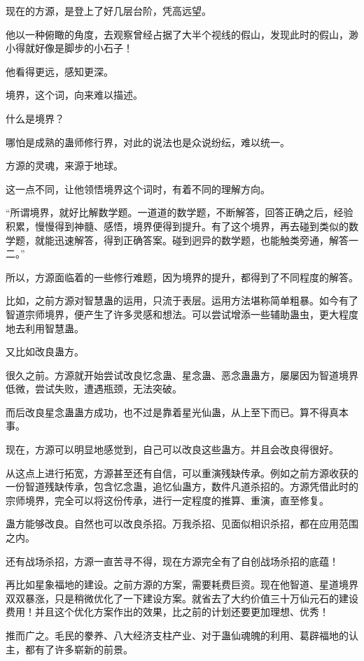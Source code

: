 \begin{this_body}
现在的方源，是登上了好几层台阶，凭高远望。

他以一种俯瞰的角度，去观察曾经占据了大半个视线的假山，发现此时的假山，渺小得就好像是脚步的小石子！

他看得更远，感知更深。

境界，这个词，向来难以描述。

什么是境界？

哪怕是成熟的蛊师修行界，对此的说法也是众说纷纭，难以统一。

方源的灵魂，来源于地球。

这一点不同，让他领悟境界这个词时，有着不同的理解方向。

“所谓境界，就好比解数学题。一道道的数学题，不断解答，回答正确之后，经验积累，慢慢得到神髓、感悟，境界便得到提升。有了这个境界，再去碰到类似的数学题，就能迅速解答，得到正确答案。碰到迥异的数学题，也能触类旁通，解答一二。”

所以，方源面临着的一些修行难题，因为境界的提升，都得到了不同程度的解答。

比如，之前方源对智慧蛊的运用，只流于表层。运用方法堪称简单粗暴。如今有了智道宗师境界，便产生了许多灵感和想法。可以尝试增添一些辅助蛊虫，更大程度地去利用智慧蛊。

又比如改良蛊方。

很久之前。方源就开始尝试改良忆念蛊、星念蛊、恶念蛊蛊方，屡屡因为智道境界低微，尝试失败，遭遇瓶颈，无法突破。

而后改良星念蛊蛊方成功，也不过是靠着星光仙蛊，从上至下而已。算不得真本事。

现在，方源可以明显地感觉到，自己可以改良这些蛊方。并且会改良得很好。

从这点上进行拓宽，方源甚至还有自信，可以重演残缺传承。例如之前方源收获的一份智道残缺传承，包含忆念蛊，追忆仙蛊方，数件凡道杀招的。方源凭借此时的宗师境界，完全可以将这份传承，进行一定程度的推算、重演，直至修复。

蛊方能够改良。自然也可以改良杀招。万我杀招、见面似相识杀招，都在应用范围之内。

还有战场杀招，方源一直苦寻不得，现在方源完全有了自创战场杀招的底蕴！

再比如星象福地的建设。之前方源的方案，需要耗费巨资。现在他智道、星道境界双双暴涨，只是稍微优化了一下建设方案。就省去了大约价值三十万仙元石的建设费用！并且这个优化方案作出的效果，比之前的计划还要更加理想、优秀！

推而广之。毛民的豢养、八大经济支柱产业、对于蛊仙魂魄的利用、葛辟福地的认主，都有了许多崭新的前景。


\end{this_body}
